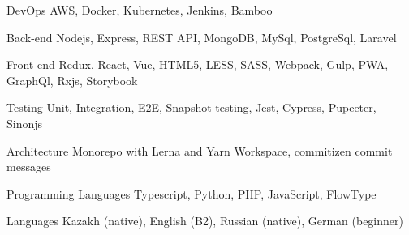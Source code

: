 

\begin{cvskills}

  \cvskill
    {DevOps} %
    {AWS, Docker, Kubernetes, Jenkins, Bamboo} %

  \cvskill
    {Back-end} %
    {Nodejs, Express, REST API, MongoDB, MySql, PostgreSql, Laravel} %

  \cvskill
    {Front-end} %
    {Redux, React, Vue, HTML5, LESS, SASS, Webpack, Gulp, PWA, GraphQl, Rxjs, Storybook} %

  \cvskill
    {Testing} %
    {Unit, Integration, E2E, Snapshot testing, Jest, Cypress, Pupeeter, Sinonjs} 

  \cvskill
    {Architecture} %
      {Monorepo with Lerna and Yarn Workspace, commitizen commit messages} 

  \cvskill
    {Programming Languages} %
    {Typescript, Python, PHP, JavaScript, FlowType} %

  \cvskill
    {Languages} %
    {Kazakh (native), English (B2), Russian (native), German (beginner)} %

\end{cvskills}
